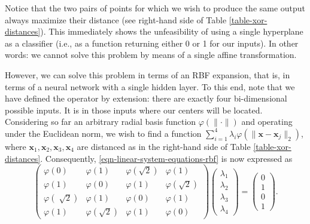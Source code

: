 \documentclass[12pt]{report} %
\newcommand{\tmmathbf}[1]{\ensuremath{\boldsymbol{#1}}}
\newcommand{\tmverbatim}[1]{\text{{\ttfamily{#1}}}}
\begin{document}
Notice that the two pairs of points for which we wish to produce the same
output always maximize their distance (see right-hand side of Table
\ref{table-xor-distances}). This immediately shows the unfeasibility of using
a single hyperplane as a classifier (i.e., as a function returning either 0 or
1 for our inputs). In other words: we cannot solve this problem by means of a
single affine transformation.

However, we can solve this problem in terms of an RBF expansion, that is, in
terms of a neural network with a single hidden layer. To this end, note that
we have defined the \tmverbatim{xor} operator by extension: there are exactly
four bi-dimensional possible inputs. It is in those inputs where our centers will be located.
Considering so far an arbitrary radial basis function $\varphi (\| \cdot \|)$
and operating under the Euclidean norm, we wish to find a function $\sum_{i =
    1}^4 \lambda_i \varphi (\| \tmmathbf{x}-\tmmathbf{x}_j \|_2)$, where
$\tmmathbf{x}_1, \tmmathbf{x}_2, \tmmathbf{x}_3, \tmmathbf{x}_4$ are distanced as in the
right-hand side of Table \ref{table-xor-distances}. Consequently,
\eqref{eqn-linear-system-equations-rbf} is now expressed as
\begin{equation}
  \left(\begin{array}{cccc}
      \varphi (0)                       & \varphi (1)                     & \varphi \left( \sqrt{2} \right) & \varphi
      (1)                                                                                                                             \\
      \varphi (1)                       & \varphi (0)                     & \varphi (1)                     & \varphi \left( \sqrt{2}
      \right)                                                                                                                         \\
      \varphi \left( \sqrt[]{2} \right) & \varphi (1)                     & \varphi (0)                     & \varphi
      (1)                                                                                                                             \\
      \varphi (1)                       & \varphi \left( \sqrt{2} \right) & \varphi (1)                     & \varphi (0)
    \end{array}\right) \left(\begin{array}{c}
      \lambda_1 \\
      \lambda_2 \\
      \lambda_3 \\
      \lambda_4
    \end{array}\right) = \left(\begin{array}{c}
      0 \\
      1 \\
      0 \\
      1
    \end{array}\right) .\label{interpolationconditionxor}
\end{equation}
\end{document}

